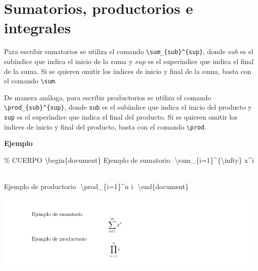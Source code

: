 \documentclass[
  a4paper,
]{scrreport}
\newenvironment{Shaded}{\begin{snugshade}}{\end{snugshade}}
\newcommand{\CommentTok}[1]{\textcolor[rgb]{0.37,0.37,0.37}{#1}}
\newcommand{\ExtensionTok}[1]{\textcolor[rgb]{0.00,0.23,0.31}{#1}}
\newcommand{\KeywordTok}[1]{\textcolor[rgb]{0.00,0.23,0.31}{#1}}
\newcommand{\NormalTok}[1]{\textcolor[rgb]{0.00,0.23,0.31}{#1}}
\newcommand{\SpecialCharTok}[1]{\textcolor[rgb]{0.37,0.37,0.37}{#1}}
\newcommand{\SpecialStringTok}[1]{\textcolor[rgb]{0.13,0.47,0.30}{#1}}
\begin{document}
\hypertarget{sumatorios-productorios-e-integrales}{%
\section{Sumatorios, productorios e
integrales}\label{sumatorios-productorios-e-integrales}}

Para escribir sumatorios se utiliza el comando
\texttt{\textbackslash{}sum\_\{sub\}\^{}\{sup\}}, donde \(sub\) es el
subíndice que indica el inicio de la suma y \(sup\) es el superíndice
que indica el final de la suma. Si se quieren omitir los índices de
inicio y final de la suma, basta con el comando
\texttt{\textbackslash{}sum}.

De manera análoga, para escribir productorios se utiliza el comando
\texttt{\textbackslash{}prod\_\{sub\}\^{}\{sup\}}, donde \texttt{sub} es
el subíndice que indica el inicio del producto y \texttt{sup} es el
superíndice que indica el final del producto. Si se quieren omitir los
índices de inicio y final del producto, basta con el comando
\texttt{\textbackslash{}prod}.

\textbf{Ejemplo}

\begin{Shaded}
\begin{Highlighting}[]
\CommentTok{\% CUERPO}
\KeywordTok{\textbackslash{}begin}\NormalTok{\{}\ExtensionTok{document}\NormalTok{\}}
\NormalTok{Ejemplo de sumatorio}
\SpecialStringTok{$$}
\SpecialCharTok{\textbackslash{}sum}\SpecialStringTok{\_\{i=1\}\^{}\{}\SpecialCharTok{\textbackslash{}infty}\SpecialStringTok{\} x\^{}i}
\SpecialStringTok{$$}

\NormalTok{Ejemplo de productorio}
\SpecialStringTok{$$}
\SpecialCharTok{\textbackslash{}prod}\SpecialStringTok{\_\{i=1\}\^{}n i}
\SpecialStringTok{$$}
\KeywordTok{\textbackslash{}end}\NormalTok{\{}\ExtensionTok{document}\NormalTok{\}}
\end{Highlighting}
\end{Shaded}

\begin{tcolorbox}[enhanced jigsaw, bottomrule=.15mm, leftrule=.75mm, opacityback=0, titlerule=0mm, bottomtitle=1mm, colbacktitle=quarto-callout-note-color!10!white, arc=.35mm, toprule=.15mm, colframe=quarto-callout-note-color-frame, title={Salida}, coltitle=black, colback=white, breakable, toptitle=1mm, rightrule=.15mm, left=2mm, opacitybacktitle=0.6]

\includegraphics{./img/formulas/sumatorio.png}

\end{tcolorbox}
\end{document}
